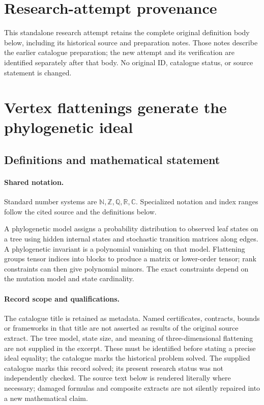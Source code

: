 \documentclass[11pt]{article}
\begin{document}
\section*{Research-attempt provenance}
This standalone research attempt retains the complete original definition body below,
including its historical source and preparation notes. Those notes describe the
earlier catalogue preparation; the new attempt and its verification are identified
separately after that body. No original ID, catalogue status, or source statement is changed.

\section{Vertex flattenings generate the phylogenetic ideal}\label{statement}

\subsection{Definitions and mathematical statement}

\paragraph{Shared notation.}Standard number systems are $\mathbb N,\mathbb Z,\mathbb Q,\mathbb R,\mathbb C$. Specialized notation and index ranges follow the cited source and the definitions below.


A phylogenetic model assigns a probability distribution to observed leaf states on a tree using hidden internal states and stochastic transition matrices along edges. A phylogenetic invariant is a polynomial vanishing on that model. Flattening groups tensor indices into blocks to produce a matrix or lower-order tensor; rank constraints can then give polynomial minors. The exact constraints depend on the mutation model and state cardinality.
\paragraph{Record scope and qualifications.}
The catalogue title is retained as metadata. Named certificates, contracts, bounds or frameworks in that title are not asserted as results of the original source extract.
The tree model, state size, and meaning of three-dimensional flattening are not supplied in the excerpt. These must be identified before stating a precise ideal equality; the catalogue marks the historical problem solved. The supplied catalogue marks this record solved; its present research status was not independently checked.
The source text below is rendered literally where necessary; damaged formulas and composite extracts are not silently repaired into a new mathematical claim.
\end{document}

